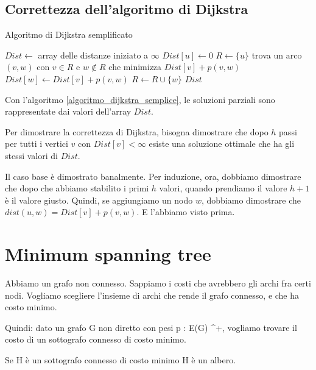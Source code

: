 \subsection{Correttezza dell'algoritmo di Dijkstra}

\begin{algorithm}
\caption{\label{algoritmo_dijkstra_semplice}Algoritmo di Dijkstra semplificato}
\begin{algorithmic}[1]
    \State $Dist \gets$ array delle distanze iniziato a $\infty$
    \State $Dist[u] \gets 0$
    \State $R \gets \{ u \}$
        \State trova un arco $(v,w)$ con $v \in R$ e $w \notin R$ che minimizza $Dist[v] + p(v,w)$
        \State $Dist[w] \gets Dist[v] + p(v,w)$
        \State $R \gets R \cup \{ w \}$
    \EndWhile
    \State \Return $Dist$
\EndFunction
\end{algorithmic}
\end{algorithm}

Con l'algoritmo \ref{algoritmo_dijkstra_semplice}, le soluzioni parziali sono rappresentate dai valori dell'array $Dist$. 

Per dimostrare la correttezza di Dijkstra, bisogna dimostrare che dopo $h$ passi per tutti i vertici $v$ con $Dist[v] < \infty$ esiste una soluzione ottimale che ha gli stessi valori di $Dist$.

Il caso base \`e dimostrato banalmente. Per induzione, ora, dobbiamo dimostrare che dopo che abbiamo stabilito i primi $h$ valori, quando prendiamo il valore $h+1$ \`e il valore giusto. Quindi, se aggiungiamo un nodo $w$, dobbiamo dimostrare che $dist(u,w) = Dist[v] + p(v,w)$. E l'abbiamo visto prima.

\section{Minimum spanning tree}

\begin{esercizio}
Abbiamo un grafo non connesso. Sappiamo i costi che avrebbero gli archi fra certi nodi. Vogliamo scegliere l'insieme di archi che rende il grafo connesso, e che ha costo minimo.

Quindi: dato un grafo G non diretto con pesi p : E(G) \to \reals^{+}, vogliamo trovare il costo di un sottografo connesso di costo minimo.
\end{esercizio}

\begin{oss}
Se H \`e un sottografo connesso di costo minimo \implies H \`e un albero.
\end{oss}

